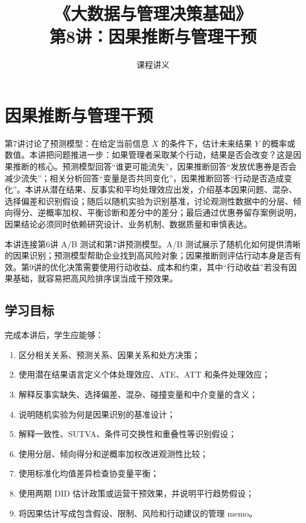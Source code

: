 \documentclass[UTF8,fontset=fandol,openany,zihao=-4]{ctexbook}
\title{《大数据与管理决策基础》\\[0.5em]\large 第8讲：因果推断与管理干预}
\author{课程讲义}
\date{}
\begin{document}
\maketitle
\tableofcontents

\setcounter{chapter}{7}
\chapter{因果推断与管理干预}
\label{ch:week08-causality}

\begin{chapterbox}
第7讲讨论了预测模型：在给定当前信息 \(X\) 的条件下，估计未来结果 \(Y\) 的概率或数值。本讲把问题推进一步：如果管理者采取某个行动，结果是否会改变？这是因果推断的核心。预测模型回答“谁更可能流失”，因果推断回答“发放优惠券是否会减少流失”；相关分析回答“变量是否共同变化”，因果推断回答“行动是否造成变化”。本讲从潜在结果、反事实和平均处理效应出发，介绍基本因果问题、混杂、选择偏差和识别假设；随后以随机实验为识别基准，讨论观测性数据中的分层、倾向得分、逆概率加权、平衡诊断和差分中的差分；最后通过优惠券留存案例说明，因果结论必须同时依赖研究设计、业务机制、数据质量和审慎表达。
\end{chapterbox}

\begin{modernbox}[课程接口]
本讲连接第6讲 A/B 测试和第7讲预测模型。A/B 测试展示了随机化如何提供清晰的因果识别；预测模型帮助企业找到高风险对象；因果推断则评估行动本身是否有效。第9讲的优化决策需要使用行动收益、成本和约束，其中“行动收益”若没有因果基础，就容易把高风险排序误当成干预效果。
\end{modernbox}

\section{学习目标}

完成本讲后，学生应能够：
\begin{enumerate}
  \item 区分相关关系、预测关系、因果关系和处方决策；
  \item 使用潜在结果语言定义个体处理效应、ATE、ATT 和条件处理效应；
  \item 解释反事实缺失、选择偏差、混杂、碰撞变量和中介变量的含义；
  \item 说明随机实验为何是因果识别的基准设计；
  \item 解释一致性、SUTVA、条件可交换性和重叠性等识别假设；
  \item 使用分层、倾向得分和逆概率加权改进观测性比较；
  \item 使用标准化均值差异检查协变量平衡；
  \item 使用两期 DID 估计政策或运营干预效果，并说明平行趋势假设；
  \item 将因果估计写成包含假设、限制、风险和行动建议的管理 memo。
\end{enumerate}
\end{document}
